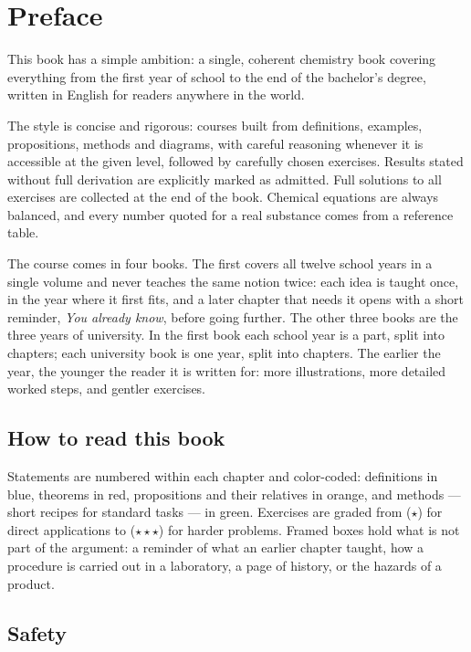 \chapter{Preface}

This book has a simple ambition: a single, coherent chemistry book
covering everything from the first year of school to the end of the
bachelor's degree, written in English for readers anywhere in the world.

The style is concise and rigorous: courses built from definitions, examples,
propositions, methods and diagrams, with careful reasoning whenever it is
accessible at the given level, followed by carefully chosen exercises.
Results stated without full derivation are explicitly marked as admitted.
Full solutions to all exercises are collected at the end of the book.
Chemical equations are always balanced, and every number quoted for a
real substance comes from a reference table.

The course comes in four books. The first covers all twelve school years
in a single volume and never teaches the same notion twice: each idea is
taught once, in the year where it first fits, and a later chapter that
needs it opens with a short reminder, \emph{You already know}, before
going further. The other three books are the three years of university.
In the first book each school year is a part, split into chapters; each
university book is one year, split into chapters. The earlier the year, the younger the reader it is written
for: more illustrations, more detailed worked steps, and gentler
exercises.

\section*{How to read this book}

Statements are numbered within each chapter and color-coded: definitions in
blue, theorems in red, propositions and their relatives in orange, and
methods --- short recipes for standard tasks --- in green. Exercises are
graded from ($\star$) for direct applications to ($\star\star\star$) for
harder problems. Framed boxes hold what is not part of the argument: a
reminder of what an earlier chapter taught, how a procedure is carried
out in a laboratory, a page of history, or the hazards of a product.

\section*{Safety}

